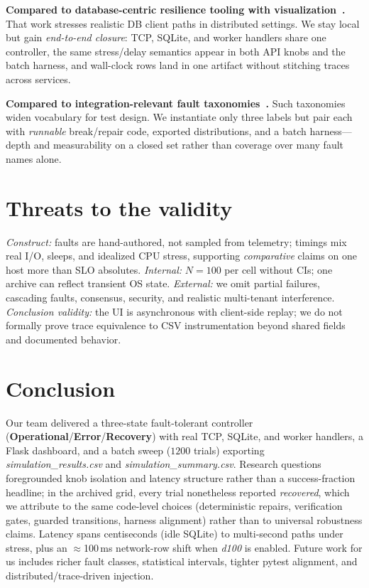 \documentclass[sigconf,authorversion,nonacm]{acmart}
\begin{document}
\textbf{Compared to database-centric resilience tooling with visualization~\cite{assad2024icse}.} That work stresses realistic DB client paths in distributed settings. We stay local but gain \emph{end-to-end closure}: TCP, SQLite, and worker handlers share one controller, the same stress/delay semantics appear in both API knobs and the batch harness, and wall-clock rows land in one artifact without stitching traces across services.

\textbf{Compared to integration-relevant fault taxonomies~\cite{gregor2025icst}.} Such taxonomies widen vocabulary for test design. We instantiate only three labels but pair each with \emph{runnable} break/repair code, exported distributions, and a batch harness---depth and measurability on a closed set rather than coverage over many fault names alone.

\section{Threats to the validity}
\label{sec:threats}
\emph{Construct:} faults are hand-authored, not sampled from telemetry; timings mix real I/O, sleeps, and idealized CPU stress, supporting \emph{comparative} claims on one host more than SLO absolutes. \emph{Internal:} $N{=}100$ per cell without CIs; one archive can reflect transient OS state. \emph{External:} we omit partial failures, cascading faults, consensus, security, and realistic multi-tenant interference. \emph{Conclusion validity:} the UI is asynchronous with client-side replay; we do not formally prove trace equivalence to CSV instrumentation beyond shared fields and documented behavior.

\section{Conclusion}
\label{sec:conclusion}
Our team delivered a three-state fault-tolerant controller (\textbf{Operational}/\textbf{Error}/\textbf{Recovery}) with real TCP, SQLite, and worker handlers, a Flask dashboard, and a batch sweep ($1200$ trials) exporting \emph{simulation\_results.csv} and \emph{simulation\_summary.csv}. Research questions foregrounded knob isolation and latency structure rather than a success-fraction headline; in the archived grid, every trial nonetheless reported \emph{recovered}, which we attribute to the same code-level choices (deterministic repairs, verification gates, guarded transitions, harness alignment) rather than to universal robustness claims. Latency spans centiseconds (idle SQLite) to multi-second paths under stress, plus an $\approx$100\,ms network-row shift when \emph{d100} is enabled. Future work for us includes richer fault classes, statistical intervals, tighter pytest alignment, and distributed/trace-driven injection.
\end{document}
